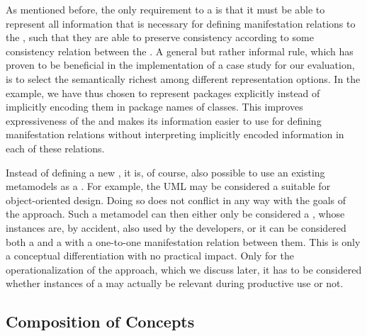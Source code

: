 As mentioned before, the only requirement to a \conceptmetamodel is that it must be able to represent all information that is necessary for defining manifestation relations to the \concretemetamodels, such that they are able to preserve consistency according to some consistency relation between the \concretemetamodels.
A general but rather informal rule, which has proven to be beneficial in the implementation of a case study for our evaluation, is to select the semantically richest among different representation options.
In the example, we have thus chosen to represent packages explicitly instead of implicitly encoding them in package names of classes.
This improves expressiveness of the \conceptmetamodel and makes its information easier to use for defining manifestation relations without interpreting implicitly encoded information in each of these relations.

Instead of defining a new \conceptmetamodels, it is, of course, also possible to use an existing metamodels as a \conceptmetamodel.
For example, the \gls{UML} may be considered a suitable \conceptmetamodel for object-oriented design.
Doing so does not conflict in any way with the goals of the \commonalities approach.
Such a metamodel can then either only be considered a \conceptmetamodel, whose instances are, by accident, also used by the developers, or it can be considered both a \conceptmetamodel and a \concretemetamodel with a one-to-one manifestation relation between them.
This is only a conceptual differentiation with no practical impact.
Only for the operationalization of the approach, which we discuss later, it has to be considered whether instances of a \conceptmetamodel may actually be relevant during productive use or not.


\subsection{Composition of Concepts}
\label{chap:improvement:commonalities:composition}

